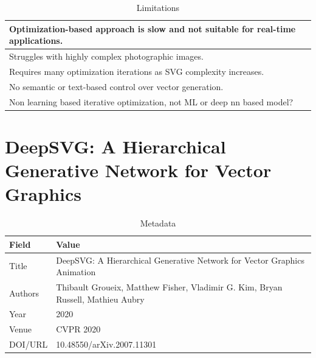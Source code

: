 \begin{table}[h!]
\centering
\caption{Limitations}
\begin{tabular}{|p{14cm}|}
\hline
Optimization-based approach is slow and not suitable for real-time applications. \\ \hline
Struggles with highly complex photographic images. \\ \hline
Requires many optimization iterations as SVG complexity increases. \\ \hline
No semantic or text-based control over vector generation. \\ \hline
Non learning based iterative optimization, not ML or deep nn based model? \\ \hline
\end{tabular}
\end{table}






\newpage
\chapter{DeepSVG: A Hierarchical Generative Network for Vector Graphics}

\begin{table}[h!]
\centering
\caption{Metadata}
\begin{tabular}{|l|l|}
\hline
\textbf{Field} & \textbf{Value} \\ \hline
Title & DeepSVG: A Hierarchical Generative Network for Vector Graphics Animation \\ \hline
Authors & Thibault Groueix, Matthew Fisher, Vladimir G. Kim, Bryan Russell, Mathieu Aubry \\ \hline
Year & 2020 \\ \hline
Venue & CVPR 2020 \\ \hline
DOI/URL & 10.48550/arXiv.2007.11301 \\ \hline
\end{tabular}
\end{table}

